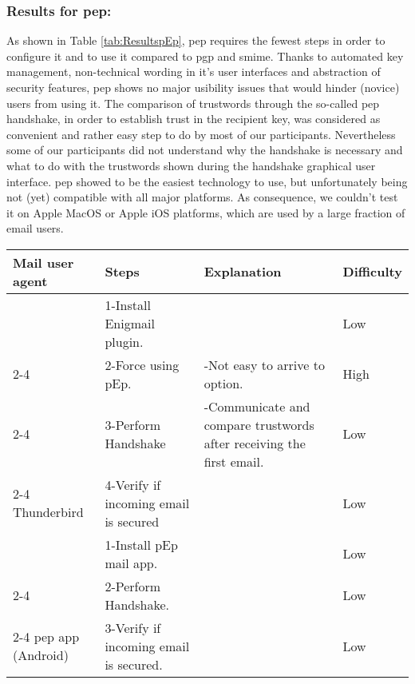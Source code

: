 \subsubsection{Results for \acrshort{pep}:}
As shown in Table \ref{tab:ResultspEp}, \acrshort{pep} requires the fewest steps in order to configure it and to use it compared to \acrshort{pgp} and \acrshort{smime}. Thanks to automated key management, non-technical wording in it's user interfaces and abstraction of security features, \acrshort{pep} shows no major usibility issues that would hinder (novice) users from using it. The comparison of trustwords through the so-called \acrshort{pep} handshake, in order to establish trust in the recipient key, was considered as convenient and rather easy step to do by most of our participants. Nevertheless some of our participants did not understand why the handshake is necessary and what to do with the trustwords shown during the handshake graphical user interface. \acrshort{pep} showed to be the easiest technology to use, but unfortunately being not (yet) compatible with all major platforms. As consequence, we couldn't test it on Apple MacOS or Apple iOS platforms, which are used by a large fraction of \acrshort{email} users.

{\def\arraystretch{1.2}\tabcolsep=3pt
\begin{table*}%
	\scriptsize
	\centering
	\begin{tabularx}{\textwidth}{|l|l|l|l|}
		\hline
		\textbf{Mail user agent}		& \textbf{Steps}   & \textbf{Explanation}  & \textbf{Difficulty}							\\ \hline
		& 1-Install Enigmail plugin.	&      						 											& Low	\\ \cline{2-4}
		& 2-Force using pEp.			& -Not easy to arrive to option.& {\color[HTML]{FE0000} High} \\ \cline{2-4}
		& 3-Perform Handshake			& -Communicate and compare trustwords after receiving the first email.	& Low	\\ \cline{2-4}
		{Thunderbird}					& 4-Verify if incoming email is secured  &                 				& Low	\\ \hline
		& 1-Install pEp mail app.		&                                                                   	& Low	\\ \cline{2-4}
		& 2-Perform Handshake.			&																		& Low	\\ \cline{2-4}
		{\acrshort{pep} app (Android)}     					& 3-Verify if incoming email is secured. &								& Low	\\
		\hline               
	\end{tabularx}
	\caption{Live observation results for \acrshort{pep} \label{tab:ResultspEp}}
\end{table*}	
}